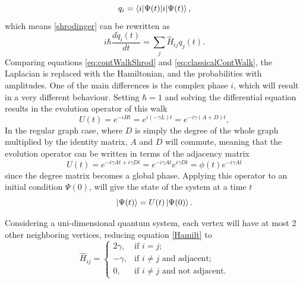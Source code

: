 \documentclass[../../dissertation.tex]{subfiles}
\begin{document}
\begin{equation}
	q_i = \braket{i|\Psi(t)},
\end{equation}
which means \ref{shrodinger} can be rewritten as 
\begin{equation}
	i\hbar \frac{dq_i(t)}{dt} = \sum_j \hat{H}_{ij} q_j(t).
	\label{eq:contWalkShrod}
\end{equation}
Comparing equations \ref{eq:contWalkShrod} and \ref{eq:classicalContWalk}, the
Laplacian is replaced with the Hamiltonian, and the probabilities with
amplitudes. One of the main differences is the complex phase $i$, which will
result in a very different behaviour. 
Setting $\hbar = 1$ and solving the differential equation results in the
evolution operator of this walk 
\begin{equation}
	U(t) = e^{-iHt} = e^{i(-\gamma L)t} = e^{-i\gamma(A+D)t},
\end{equation}
In the regular graph case, where $D$ is simply the degree of the whole graph
multiplied by the identity matrix, $A$ and $D$ will commute, meaning that the
evolution operator can be written in terms of the adjacency matrix 
\begin{equation}
	U(t) = e^{-i\gamma A t + i\gamma D t} = e^{-i\gamma A t} e^{i\gamma D t} = \phi(t) e^{-i\gamma A t} 
	\label{eq:contSimulUniOp}
\end{equation}
since the degree matrix becomes a global phase.
Applying this operator to an initial condition $\Psi(0)$, will give the state
of the system at a time $t$
\begin{equation}
	\ket{\Psi(t)} = U(t)\ket{\Psi(0)}.
\end{equation}\par

Considering a uni-dimensional quantum system, each vertex
will have at most 2 other neighboring vertices, reducing equation \ref{Hamilt}
to
\begin{equation}
	\hat{H}_{ij} = \begin{cases} 
		2\gamma, & \mbox{if } i= j; \\ 
		-\gamma, & \mbox{if } i\neq j\mbox{ and adjacent};\\
		0, & \mbox{if } i\neq j\mbox{ and not adjacent}.
	\end{cases}
\end{equation}\par
\end{document}
